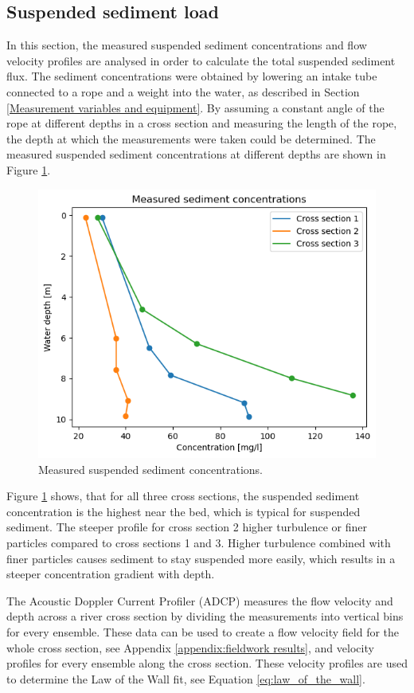 \subsection{Suspended sediment load}
\label{sec: Suspended sediment load}
In this section, the measured suspended sediment concentrations and flow velocity profiles are analysed in order to calculate the total suspended sediment flux. The sediment concentrations were obtained by lowering an intake tube connected to a rope and a weight into the water, as described in Section \ref{Measurement variables and equipment}. By assuming a constant angle of the rope at different depths in a cross section and measuring the length of the rope, the depth at which the measurements were taken could be determined. The measured suspended sediment concentrations at different depths are shown in Figure \ref{fig:Measured suspended sediment concentrations}.

\begin{figure}[H]
    \centering
    \includegraphics[width=0.75\linewidth]{figures/ch6/Measured_SSC.png}
    \caption{Measured suspended sediment concentrations.}
    \label{fig:Measured suspended sediment concentrations}
\end{figure}

Figure \ref{fig:Measured suspended sediment concentrations} shows, that for all three cross sections, the suspended sediment concentration is the highest near the bed, which is typical for suspended sediment. The steeper profile for cross section 2 higher turbulence or finer particles compared to cross sections 1 and 3. Higher turbulence combined with finer particles causes sediment to stay suspended more easily, which results in a steeper concentration gradient with depth.

The Acoustic Doppler Current Profiler (ADCP) measures the flow velocity and depth across a river cross section by dividing the measurements into vertical bins for every ensemble. These data can be used to create a flow velocity field for the whole cross section, see Appendix \ref{appendix:fieldwork results}, and velocity profiles for every ensemble along the cross section. These velocity profiles are used to determine the Law of the Wall fit, see Equation \ref{eq:law_of_the_wall}.

